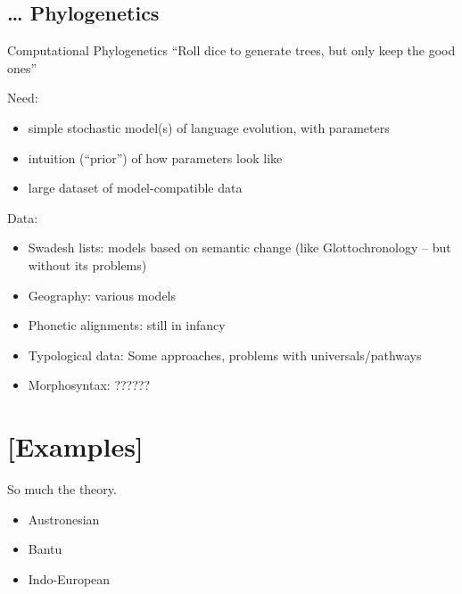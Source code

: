 \documentclass[9pt]{beamer}
\begin{document}
\subsection{… Phylogenetics}
\begin{frame}{Computational Phylogenetics}
  “Roll dice to generate trees, but only keep the good ones”

  \pause
  Need:
  \begin{itemize}
  \item simple stochastic model(s) of language evolution, with parameters
  \item intuition (“prior”) of how parameters look like
  \item large dataset of model-compatible data
  \end{itemize}

  \pause
  Data:
  \begin{itemize}
  \item Swadesh lists: models based on semantic change (like Glottochronology – but without its problems)
  \item Geography: various models
  \item Phonetic alignments: still in infancy
  \item Typological data: Some approaches, problems with universals/pathways
  \item Morphosyntax: ??????
  \end{itemize}
\end{frame}
\section{[Examples]}
\begin{frame}{So much the theory.}
  \begin{itemize}
  \item Austronesian
  \item Bantu
  \item Indo-European
  \end{itemize}
\end{frame}
\end{document}
